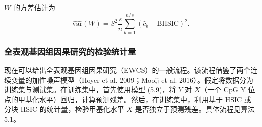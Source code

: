 $W$ 的方差估计为
\begin{equation}
\widehat{\mathrm{var}}(W)=S^2\frac sn\sum_{b=1}^{n/s}(\widehat c_b-\mathrm{BHSIC})^2.
\tag{5.55}
\end{equation}

\subsubsection{全表观基因组因果研究的检验统计量}

现在可以给出全表观基因组因果研究（EWCS）的一般流程。该流程借鉴了两个连续变量的加性噪声模型（Hoyer et al. 2009；Mooij et al. 2016）。假定将数据分为训练集与测试集。在训练集中，首先使用模型 (5.9)，将 $Y$ 对 $X$（一个 CpG Y 位点的甲基化水平）回归，计算预测残差。然后，在训练集中，利用基于 HSIC 或分块 HSIC 的统计量，检验甲基化水平 $X$ 是否独立于预测残差。具体流程见算法 5.1。

